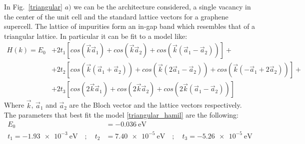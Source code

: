 In Fig.~\ref{triangular} $a)$ we can be the architecture considered, a single vacancy in the center of the unit cell and the standard lattice vectors for a graphene supercell. The lattice of impurities form an in-gap band which resembles that of a triangular lattice.
In particular it can be fit to a model like:
\begin{equation}
\begin{split}
  H(k) = E_0 &+
         2t_1\left[ cos\left(\vec{k}\vec{a}_1\right) +
                    cos\left(\vec{k}\vec{a}_2\right) +
                    cos\left(\vec{k}(\vec{a}_1-\vec{a}_2)\right)
              \right] +\\
         &+2t_2\left[ cos\left(\vec{k}(\vec{a}_1+\vec{a}_2)\right) +
                    cos\left(\vec{k}(2\vec{a}_1-\vec{a}_2)\right) +
                    cos\left(\vec{k}(-\vec{a}_1+2\vec{a}_2)\right)
             \right] +\\
         &+2t_3\left[ cos\left(2\vec{k}\vec{a}_1\right) +
                    cos\left(2\vec{k}\vec{a}_2\right) +
                    cos\left(2\vec{k}(\vec{a}_1-\vec{a}_2)\right)
              \right]
\end{split}
\label{triangular_hamil}
\end{equation}
Where $\vec{k}$, $\vec{a}_1$ and $\vec{a}_2$ are the Bloch vector and the lattice vectors respectively. The parameters that best fit the model \eqref{triangular_hamil} are the following:
\begin{equation}
\begin{split}
  E_0 &= \SI{-0.036}{\eV}\\
  t_1 = \SI{-1.93e-3}{\eV} \quad;\quad
  t_2 &= \SI{7.40e-5}{\eV} \quad;\quad
  t_3 = \SI{-5.26e-5}{\eV}
\end{split}
\end{equation}


